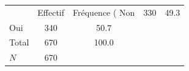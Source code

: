 {
\def\sym#1{\ifmmode^{#1}\else\(^{#1}\)\fi}
\begin{tabular}{l*{1}{cc}}
\toprule
            &    Effectif&Fréquence (%
\midrule
Non         &         330&        49.3\\
Oui         &         340&        50.7\\
Total       &         670&       100.0\\
\midrule
\(N\)       &         670&            \\
\bottomrule
\end{tabular}
}
